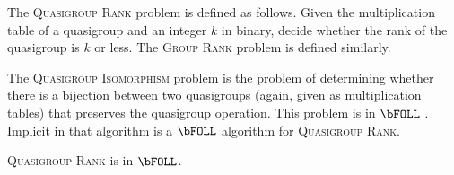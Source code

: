 \documentclass{article}
\begin{document}
The \textsc{Quasigroup Rank} problem is defined as follows.
Given the multiplication table of a quasigroup and an integer $k$ in binary, decide whether the rank of the quasigroup is $k$ or less.
The \textsc{Group Rank} problem is defined similarly.

The \textsc{Quasigroup Isomorphism} problem is the problem of determining whether there is a bijection between two quasigroups (again, given as multiplication tables) that preserves the quasigroup operation.
This problem is in $\bFOLL$ \autocite[Theorem~3.4]{ctw13}.
Implicit in that algorithm is a $\bFOLL$ algorithm for \textsc{Quasigroup Rank}.

\begin{theorem}
  \textsc{Quasigroup Rank} is in $\bFOLL$.
\end{theorem}
\end{document}
